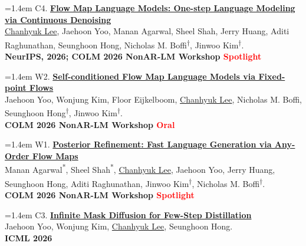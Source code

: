 \documentclass[a4paper,10pt]{extarticle}
\newcommand{\venue}[1]{\textbf{#1}}
\begin{document}
\noindent\begin{minipage}[t]{\linewidth}
\hangindent=1.4em
C4. \href{https://arxiv.org/abs/2602.16813}{\textbf{Flow Map Language Models: One-step Language Modeling via Continuous Denoising}} \\[1pt]
\underline{Chanhyuk Lee}, Jaehoon Yoo, Manan Agarwal, Sheel Shah, Jerry Huang, Aditi Raghunathan, Seunghoon Hong, Nicholas M. Boffi\textsuperscript{\ensuremath{\dagger}}, Jinwoo Kim\textsuperscript{\ensuremath{\dagger}}. \\[3pt]
\venue{NeurIPS, 2026; COLM 2026 NonAR-LM Workshop \textcolor{red}{Spotlight}}

\vspace{6pt}
\end{minipage}
\noindent\begin{minipage}[t]{\linewidth}
\hangindent=1.4em
W2. \href{https://arxiv.org/abs/2607.00714}{\textbf{Self-conditioned Flow Map Language Models via Fixed-point Flows}} \\[1pt]
Jaehoon Yoo, Wonjung Kim, Floor Eijkelboom, \underline{Chanhyuk Lee}, Nicholas M. Boffi, Seunghoon Hong\textsuperscript{\ensuremath{\dagger}}, Jinwoo Kim\textsuperscript{\ensuremath{\dagger}}.\\[3pt]
\venue{COLM 2026 NonAR-LM Workshop \textcolor{red}{Oral}}

\vspace{6pt}
\end{minipage}
\noindent\begin{minipage}[t]{\linewidth}
\hangindent=1.4em
W1. \href{https://arxiv.org/abs/2606.24773}{\textbf{Posterior Refinement:
Fast Language Generation via Any-Order Flow Maps}} \\[1pt]
Manan Agarwal\textsuperscript{*}, Sheel Shah\textsuperscript{*}, \underline{Chanhyuk Lee}, Jaehoon Yoo, Jerry Huang, Seunghoon Hong, Aditi Raghunathan, Jinwoo Kim\textsuperscript{\ensuremath{\dagger}}, Nicholas M. Boffi\textsuperscript{\ensuremath{\dagger}}. \\[3pt]
\venue{COLM 2026 NonAR-LM Workshop \textcolor{red}{Spotlight}}

\vspace{6pt}
\end{minipage}
\noindent\begin{minipage}[t]{\linewidth}
\hangindent=1.4em
C3. \href{https://arxiv.org/abs/2605.10518}{\textbf{Infinite Mask Diffusion for Few-Step Distillation}} \\[1pt]
Jaehoon Yoo, Wonjung Kim, \underline{Chanhyuk Lee}, Seunghoon Hong. \\[3pt]
\venue{ICML 2026}

\vspace{6pt}
\end{minipage}
\end{document}
